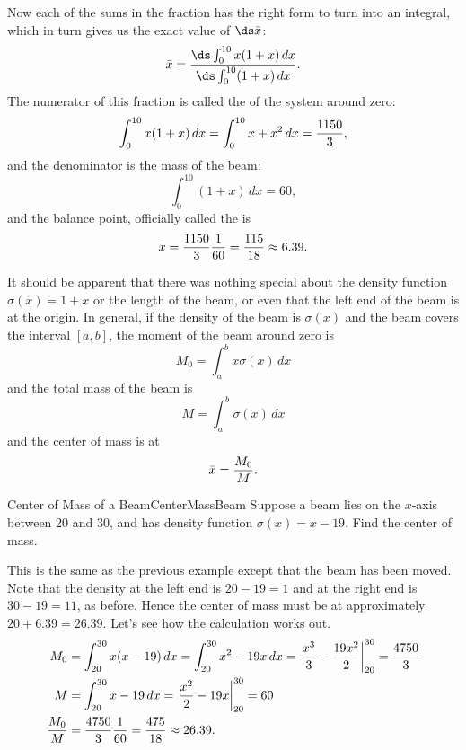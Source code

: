 \begin{solution}
Now each of the sums in the fraction has the right form to turn into
an integral, which in turn gives us the exact value of $\ds \bar x$:
\[
  \bar x={\ds\int_0^{10} x(1+x)\,dx\over\ds\int_{0}^{10}(1+x)\,dx}.
\]
The numerator of this fraction is called the  of the system around zero:
\[\int_0^{10} x(1+x)\,dx=\int_0^{10} x+x^2\,dx={1150\over 3},\]
and the denominator is the mass of the beam:
\[\int_0^{10} (1+x)\,dx=60,\]
and the balance point, officially called the  is 
\[\bar x={1150\over 3}{1\over 60} = {115\over 18}\approx 6.39.\]
\end{solution}

It should be apparent that there was nothing special about the density
function $\sigma(x)=1+x$ or the length of the beam, or even that the
left end of the beam is at the origin. In general, if the density of
the beam is $\sigma(x)$ and the beam covers the interval $[a,b]$, the
moment of the beam around zero is
\[M_0=\int_a^b x\sigma(x)\,dx\]
and the total mass of the beam is
\[M=\int_a^b \sigma(x)\,dx\]
and the center of mass is at
\[\bar x={M_0\over M}.\]
\begin{example}{Center of Mass of a Beam}{CenterMassBeam}
Suppose a beam lies on the $x$-axis between 20 and 30, and
has density function $\sigma(x)=x-19$. Find the center of mass.
\end{example}
\begin{solution}
This is the same as the previous example except that the beam has been
moved. Note that the density at the left end is $20-19=1$ and at the
right end is $30-19=11$, as before. Hence the center of mass must be
at approximately $20+6.39=26.39$. Let's see how the calculation works
out.
\begin{align*}
  M_0&=\int_{20}^{30} x(x-19)\,dx=\int_{20}^{30} x^2-19x\,dx=
    \left.{x^3\over3}-{19x^2\over2}\right|_{20}^{30}={4750\over3}	\\
  M&=\int_{20}^{30} x-19\,dx=\left.{x^2\over2}-19x\right|_{20}^{30}=60	\\
  {M_0\over M}&={4750\over3}{1\over60}={475\over18}\approx 26.39.
\end{align*}
\end{solution}

